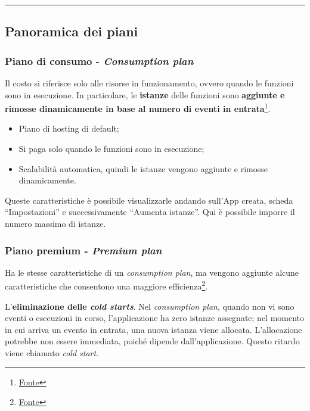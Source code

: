 \documentclass[a4paper]{article}
\newcommand{\longline}{\noindent\rule{\textwidth}{0.4pt}}
\newcommand{\dquotes}[1]{``#1''}
\begin{document}
	\longline
	
	\subsection{Panoramica dei piani}
	
	\subsubsection{Piano di consumo - \emph{Consumption plan}}
	
	Il costo si riferisce solo alle risorse in funzionamento, ovvero quando le funzioni sono in esecuzione. In particolare, le \textbf{istanze} delle funzioni sono \textbf{aggiunte e rimosse dinamicamente in base al numero di eventi in entrata}\footnote{\href{https://learn.microsoft.com/en-gb/azure/azure-functions/consumption-plan}{Fonte}}.
	
	\begin{itemize}[label=]
		\item Piano di hosting di default;
		
		\item Si paga solo quando le funzioni sono in esecuzione;
		
		\item Scalabilità automatica, quindi le istanze vengono aggiunte e rimosse dinamicamente.
	\end{itemize}
	
	Queste caratteristiche è possibile visualizzarle andando sull'App creata, scheda \dquotes{Impostazioni} e successivamente \dquotes{Aumenta istanze}. Qui è possibile imporre il numero massimo di istanze.\newpage
	
	\subsubsection{Piano premium - \emph{Premium plan}}
	
	Ha le stesse caratteristiche di un \emph{consumption plan}, ma vengono aggiunte alcune caratteristiche che consentono una maggiore efficienza\footnote{\href{https://learn.microsoft.com/en-gb/azure/azure-functions/functions-premium-plan}{Fonte}}.\newline
	
	\noindent
	L'\textbf{eliminazione delle \emph{cold starts}}. Nel \emph{consumption plan}, quando non vi sono eventi o esecuzioni in corso, l'applicazione ha zero istanze assegnate; nel momento in cui arriva un evento in entrata, una nuova istanza viene allocata. L'allocazione potrebbe non essere immediata, poiché dipende dall'applicazione. Questo ritardo viene chiamato \emph{cold start}.
	
\end{document}
